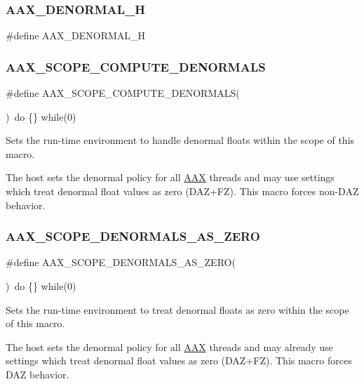 \subsubsection{\texorpdfstring{AAX\_DENORMAL\_H}{AAX\_DENORMAL\_H}}
{\footnotesize\ttfamily \#define A\+A\+X\+\_\+\+D\+E\+N\+O\+R\+M\+A\+L\+\_\+H}

\mbox{\label{a00755_ad45309abfd0e2faa7a28c9ed753f7806}} 
\subsubsection{\texorpdfstring{AAX\_SCOPE\_COMPUTE\_DENORMALS}{AAX\_SCOPE\_COMPUTE\_DENORMALS}}
{\footnotesize\ttfamily \#define A\+A\+X\+\_\+\+S\+C\+O\+P\+E\+\_\+\+C\+O\+M\+P\+U\+T\+E\+\_\+\+D\+E\+N\+O\+R\+M\+A\+LS(\begin{DoxyParamCaption}{ }\end{DoxyParamCaption})~do \{\} while(0)}



Sets the run-\/time environment to handle denormal floats within the scope of this macro. 

The host sets the denormal policy for all \mbox{\hyperlink{a00852}{A\+AX}} threads and may use settings which treat denormal float values as zero (D\+A\+Z+\+FZ). This macro forces non-\/\+D\+AZ behavior. \mbox{\label{a00755_aeb63901cb0661447fb69b6d10f5f1cba}} 
\subsubsection{\texorpdfstring{AAX\_SCOPE\_DENORMALS\_AS\_ZERO}{AAX\_SCOPE\_DENORMALS\_AS\_ZERO}}
{\footnotesize\ttfamily \#define A\+A\+X\+\_\+\+S\+C\+O\+P\+E\+\_\+\+D\+E\+N\+O\+R\+M\+A\+L\+S\+\_\+\+A\+S\+\_\+\+Z\+E\+RO(\begin{DoxyParamCaption}{ }\end{DoxyParamCaption})~do \{\} while(0)}



Sets the run-\/time environment to treat denormal floats as zero within the scope of this macro. 

The host sets the denormal policy for all \mbox{\hyperlink{a00852}{A\+AX}} threads and may already use settings which treat denormal float values as zero (D\+A\+Z+\+FZ). This macro forces D\+AZ behavior. 